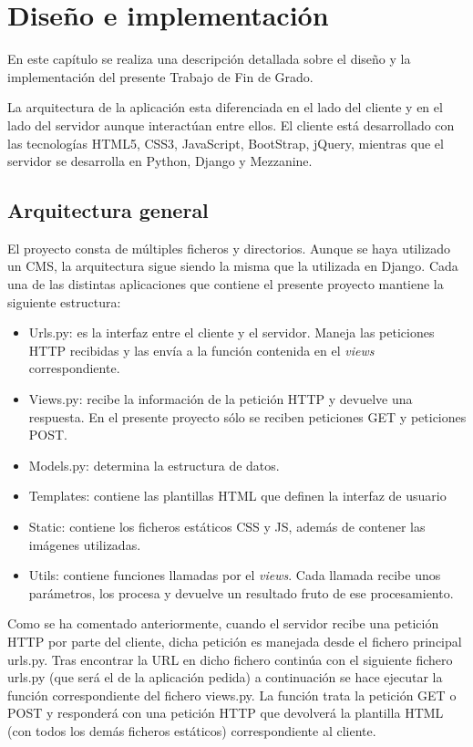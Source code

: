 \cleardoublepage
\chapter{Diseño e implementación}
\label{chap:design_implement}



En este capítulo se realiza una descripción detallada sobre el diseño y la implementación del presente Trabajo de Fin de Grado.


La arquitectura de la aplicación esta diferenciada en el lado del cliente y en el lado del servidor aunque interactúan entre ellos. El cliente está desarrollado con las tecnologías HTML5, CSS3, JavaScript, BootStrap, jQuery, mientras que el servidor se desarrolla en Python, Django y Mezzanine.



\section{Arquitectura general} 
\label{sec:arquitectura}

El proyecto consta de múltiples ficheros y directorios. Aunque se haya utilizado un CMS, la arquitectura sigue siendo la misma que la utilizada en Django. Cada una de las distintas aplicaciones que contiene el presente proyecto mantiene la siguiente estructura:
\begin{itemize}
\item Urls.py: es la interfaz entre el cliente y el servidor. Maneja las peticiones HTTP recibidas y las envía a la función contenida en el \textit{views} correspondiente.
\item Views.py: recibe la información de la petición HTTP y devuelve una respuesta. En el presente proyecto sólo se reciben peticiones GET y peticiones POST.
\item Models.py: determina la estructura de datos.
\item Templates: contiene las plantillas HTML que definen la interfaz de usuario
\item Static: contiene los ficheros estáticos CSS y JS, además de contener las imágenes utilizadas.
\item Utils: contiene funciones llamadas por el \textit{views}. Cada llamada recibe unos parámetros, los procesa y devuelve un resultado fruto de ese procesamiento.
\end{itemize}


Como se ha comentado anteriormente, cuando el servidor recibe una petición HTTP por parte del cliente, dicha petición es manejada desde el fichero principal urls.py. Tras encontrar la URL en dicho fichero continúa con el siguiente fichero urls.py (que será el de la aplicación pedida) a continuación se hace ejecutar la función correspondiente del fichero views.py. La función trata la petición GET o POST y responderá con una petición HTTP que devolverá la plantilla HTML (con todos los demás ficheros estáticos) correspondiente al cliente.


